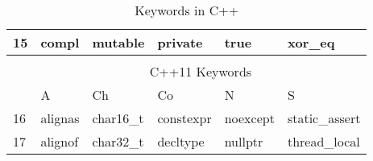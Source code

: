 \begin{table}[!h]
\begin{tabular}{|l|l|l|l|l|l|}
15 & compl & mutable & private & true & xor\_eq \\ 
\hline
\multicolumn{1}{l}{} & \multicolumn{1}{l}{} & \multicolumn{1}{l}{} & \multicolumn{1}{l}{} & \multicolumn{1}{l}{} & \multicolumn{1}{l}{} \\ 
\hhline{~-----|}
\multicolumn{1}{l|}{} & \multicolumn{5}{c|}{{\cellcolor[rgb]{1,0.741,0.267}}C++11 Keywords    } \\ 
\cline{2-6}
\multicolumn{1}{l|}{} & A & Ch & Co & N & S \\ 
\hline
\rowcolor[rgb]{0.753,0.753,0.753} 16 & alignas & char16\_t & constexpr & noexcept & static\_assert \\
17 & alignof & char32\_t & decltype & nullptr & thread\_local \\
\hline
\end{tabular}
\caption{Keywords in C++}
\label{tab:t_00_Basics_Keywords_Cpp}
\end{table}